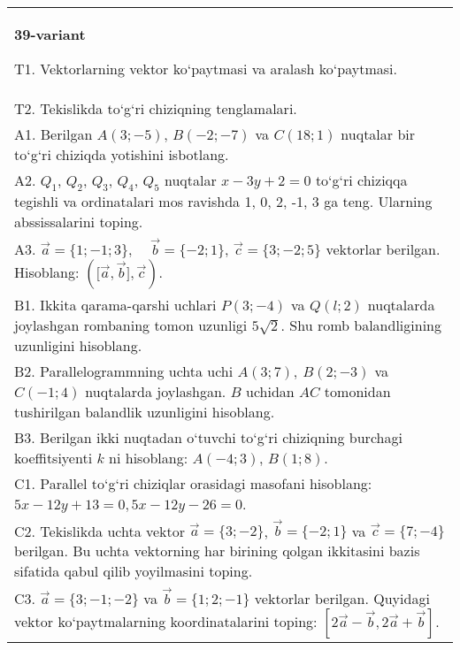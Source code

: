 \documentclass{article}
\begin{document}
\begin{tabular}{m{17cm}}
\textbf{39-variant}

T1. 
Vektorlarning vektor ko‘paytmasi va aralash ko‘paytmasi.
 \\
T2. 
Tekislikda to‘g‘ri chiziqning tenglamalari.
 \\
A1. 
Berilgan $A (3; -5) $, $B (-2; -7)$ va
$C (18; 1) $ nuqtalar bir to‘g‘ri chiziqda yotishini isbotlang.
 \\
A2. 
$Q_1$, $Q_2$, $Q_3$, $Q_4$, $Q_5$ nuqtalar
$x-3y+2=0$ to‘g‘ri chiziqqa tegishli va ordinatalari mos ravishda
1, 0, 2, -1, 3 ga teng. Ularning abssissalarini toping.
 \\
A3. 
$\overrightarrow{a}
= \{ 1; - 1;3\}, \ \ \ \ \ \overrightarrow{b} = \{ - 2;1\}$, $\overrightarrow{c} = \{3; -2;5\}$ vektorlar berilgan. Hisoblang:
$ (\lbrack\overrightarrow{a},\overrightarrow{b}\rbrack,\overrightarrow{c}) $.
 \\
B1. 
Ikkita qarama-qarshi uchlari $P (3; -4) $ va $Q (l;2) $ nuqtalarda joylashgan rombaning tomon uzunligi \(5\sqrt{2}\). Shu romb balandligining uzunligini hisoblang.
 \\
B2. 
Parallelogrammning uchta uchi \(A (3;7),\ B (2;-3) \) va
\(C (-1;4) \) nuqtalarda joylashgan. $B$ uchidan $AC$
tomonidan tushirilgan balandlik uzunligini hisoblang.
 \\
B3. 
Berilgan ikki nuqtadan o‘tuvchi to‘g‘ri chiziqning burchagi
koeffitsiyenti $k$ ni hisoblang: $A (-4;3) $, $B (1;8) $.
 \\
C1. 
Parallel to‘g‘ri chiziqlar orasidagi masofani hisoblang: $5x-12y+13=0, 5x-12y-26=0$.
 \\
C2. 
Tekislikda uchta vektor $\vec{a} = \{ 3; - 2\}$, $\vec{b} = \{ - 2;1\}$ va $\vec{c} = \{ 7; - 4\}$ berilgan. Bu uchta vektorning har birining qolgan ikkitasini bazis sifatida qabul qilib yoyilmasini toping.
 \\
C3. 
$\vec{a} = \{ 3; - 1; - 2\}$ va $\vec{b} = \{ 1;2; - 1\}$ vektorlar berilgan. Quyidagi vektor ko‘paytmalarning koordinatalarini toping:
$\left\lbrack 2\vec{a} - \vec{b},2\vec{a} + \vec{b} \right\rbrack$.
 \\

\end{tabular}
\vspace{1cm}
\end{document}

